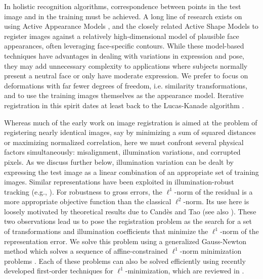 \documentclass[10pt,journal,letterpaper,compsoc]{IEEEtran}
\begin{document}
In holistic recognition algorithms, correspondence between points in the test
image and in the training must be achieved.  A long line of research exists on
using Active Appearance Models \cite{Cootes2001-PAMI}, and the closely related
Active Shape Models \cite{cootes1992active} to register images against a
relatively high-dimensional model of plausible face appearances, often
leveraging face-specific contours.  While these model-based techniques have
advantages in dealing with variations in expression and pose, they may add
unnecessary complexity to applications where subjects normally present a neutral face
or only have moderate expression. We prefer to focus on deformations with far fewer
degrees of freedom, i.e. similarity transformations, and to use the training images themselves
as the appearance model. Iterative registration in this spirit dates at least back to the
Lucas-Kanade algorithm \cite{lucas1981iterative}.

Whereas much of the early work on image registration is aimed at the
problem of registering nearly identical images, say by minimizing a sum of
squared distances or maximizing normalized correlation, here we must confront several physical factors
simultaneously: misalignment, illumination variations, and corrupted pixels.
As we discuss further below, illumination variation can be dealt by
expressing the test image as a linear combination of an appropriate set of
training images. Similar representations have been exploited in
illumination-robust tracking (e.g., \cite{Belhumeur1999-PAA,Murase1995-IJCV}).
For robustness to gross errors, the $\ell^1$-norm of the residual is a more
appropriate objective function than the classical $\ell^2$-norm. Its use here
is loosely motivated by theoretical results due to Cand\`{e}s and Tao
\cite{CandesE2005-IT} (see also \cite{Wright2008-IT}). These two observations
lead us to pose the registration problem as the search for a set of
transformations and illumination coefficients that minimize the $\ell^1$-norm
of the representation error. We solve this problem using a generalized
Gauss-Newton method which solves a sequence of affine-constrained $\ell^1$-norm
minimization problems \cite{Osborne1990-JAMSSB,Jittorntrum1980-NM}. Each of
these problems can also be solved efficiently using recently developed
first-order techniques for $\ell^1$-minimization, which are reviewed in
\cite{YangA2010-pp}.
\end{document}
